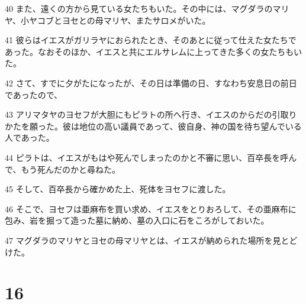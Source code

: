 \par 40 また、遠くの方から見ている女たちもいた。その中には、マグダラのマリヤ、小ヤコブとヨセとの母マリヤ、またサロメがいた。
\par 41 彼らはイエスがガリラヤにおられたとき、そのあとに従って仕えた女たちであった。なおそのほか、イエスと共にエルサレムに上ってきた多くの女たちもいた。
\par 42 さて、すでに夕がたになったが、その日は準備の日、すなわち安息日の前日であったので、
\par 43 アリマタヤのヨセフが大胆にもピラトの所へ行き、イエスのからだの引取りかたを願った。彼は地位の高い議員であって、彼自身、神の国を待ち望んでいる人であった。
\par 44 ピラトは、イエスがもはや死んでしまったのかと不審に思い、百卒長を呼んで、もう死んだのかと尋ねた。
\par 45 そして、百卒長から確かめた上、死体をヨセフに渡した。
\par 46 そこで、ヨセフは亜麻布を買い求め、イエスをとりおろして、その亜麻布に包み、岩を掘って造った墓に納め、墓の入口に石をころがしておいた。
\par 47 マグダラのマリヤとヨセの母マリヤとは、イエスが納められた場所を見とどけた。

\chapter{16}


